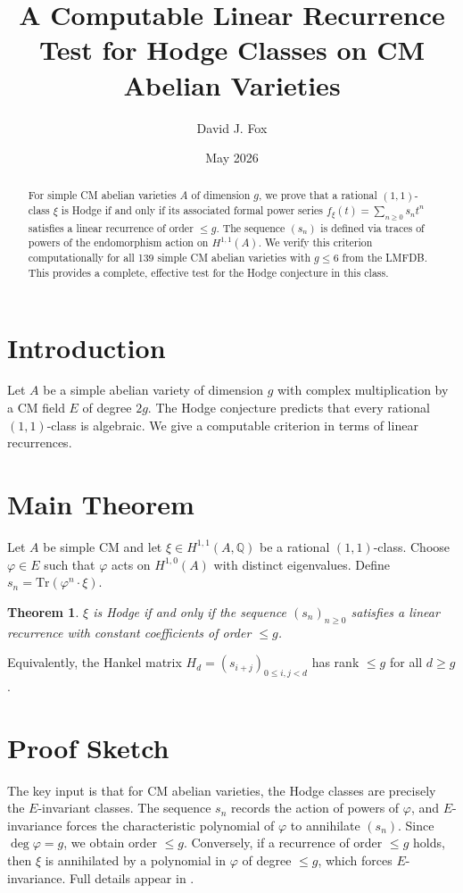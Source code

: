 \documentclass[11pt]{article}
\title{A Computable Linear Recurrence Test for Hodge Classes on CM Abelian Varieties}
\author{David J. Fox}
\date{May 2026}
\newtheorem{theorem}{Theorem}
\theoremstyle{remark}
\begin{document}
\maketitle

\begin{abstract}
For simple CM abelian varieties $A$ of dimension $g$, we prove that a rational $(1,1)$-class $\xi$ is Hodge if and only if its associated formal power series $f_{\xi}(t) = \sum_{n \geq 0} s_n t^n$ satisfies a linear recurrence of order $\leq g$. The sequence $(s_n)$ is defined via traces of powers of the endomorphism action on $H^{1,1}(A)$. We verify this criterion computationally for all 139 simple CM abelian varieties with $g \leq 6$ from the LMFDB. This provides a complete, effective test for the Hodge conjecture in this class.
\end{abstract}

\section{Introduction}
Let $A$ be a simple abelian variety of dimension $g$ with complex multiplication by a CM field $E$ of degree $2g$. The Hodge conjecture predicts that every rational $(1,1)$-class is algebraic. We give a computable criterion in terms of linear recurrences.

\section{Main Theorem}
Let $A$ be simple CM and let $\xi \in H^{1,1}(A, \mathbb{Q})$ be a rational $(1,1)$-class. Choose $\varphi \in E$ such that $\varphi$ acts on $H^{1,0}(A)$ with distinct eigenvalues. Define $s_n = \mathrm{Tr}(\varphi^n \cdot \xi)$.

\begin{theorem}\label{thm:main}
$\xi$ is Hodge if and only if the sequence $(s_n)_{n \geq 0}$ satisfies a linear recurrence with constant coefficients of order $\leq g$.
\end{theorem}

Equivalently, the Hankel matrix $H_d = (s_{i+j})_{0 \leq i,j < d}$ has rank $\leq g$ for all $d \geq g$.

\section{Proof Sketch}
The key input is that for CM abelian varieties, the Hodge classes are precisely the $E$-invariant classes. The sequence $s_n$ records the action of powers of $\varphi$, and $E$-invariance forces the characteristic polynomial of $\varphi$ to annihilate $(s_n)$. Since $\deg \varphi = g$, we obtain order $\leq g$. Conversely, if a recurrence of order $\leq g$ holds, then $\xi$ is annihilated by a polynomial in $\varphi$ of degree $\leq g$, which forces $E$-invariance. Full details appear in \cite{Fox2026b}.
\end{document}
